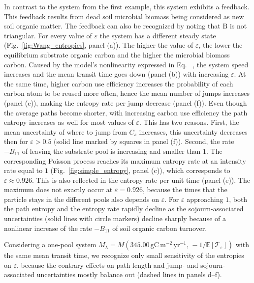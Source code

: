 \documentclass[smallextended]{svjour3}
\makeatletter
\renewcommand*{\eqref}[1]{%
  \hyperref[{#1}]{\textup{\tagform@{\ref*{#1}}}}%
}
\renewcommand{\tens}[1]{\mathrm{#1}}
\newcommand{\E}{\mathbb{E}}
\newcommand{\TT}{\mathcal{T}}
\newcommand{\gC}{\mathrm{gC}}
\newcommand{\yr}{\mathrm{yr}}
\newcommand{\meter}{\mathrm{m}}
\makeatother
\begin{document}
In contrast to the system from the first example, this system exhibits a feedback.
This feedback results from dead soil microbial biomass being considered as new soil organic matter.
The feedback can also be recognized by noting that $\tens{B}$ is not triangular.
For every value of $\varepsilon$ the system has a different steady state (Fig.~\ref{fig:Wang_entropies}, panel (a)).
The higher the value of $\varepsilon$, the lower the equilibrium substrate organic carbon and the higher the microbial biomass carbon.
Caused by the model's nonlinearity expressed in Eq.~\eqref{eqn:lambdax}, the system speed increases and the mean transit time goes down (panel (b)) with increasing $\varepsilon$.
At the same time, higher carbon use efficiency increases the probability of each carbon atom to be reused more often, hence the mean number of jumps increases (panel (c)), making the entropy rate per jump decrease (panel (f)).
Even though the average paths become shorter, with increasing carbon use efficiency the path entropy increases as well for most values of $\varepsilon$.
This has two reasons.
First, the mean uncertainty of where to jump from $C_s$ increases, this uncertainty decreases then for $\varepsilon>0.5$ (solid line marked by squares in panel (f)).
Second, the rate $-B_{11}$ of leaving the substrate pool is increasing and smaller than $1$.
The corresponding Poisson process reaches its maximum entropy rate at an intensity rate equal to $1$ (Fig.~\ref{fig:simple_entropy}, panel (c)), which corresponds to $\varepsilon\approx0.926$.
This is also reflected in the entropy rate per unit time (panel (e)).
The maximum does not exactly occur at $\varepsilon=0.926$, because the times that the particle stays in the different pools also depends on $\varepsilon$.
For $\varepsilon$ approaching $1$, both the path entropy and the entropy rate rapidly decline as the sojourn-associated uncertainties (solid lines with circle markers) decline sharply because of a nonlinear increase of the rate $-B_{11}$ of soil organic carbon turnover.

Considering a one-pool system $M_\lambda=M(345.00\,\gC\,\meter^{-2}\,\yr^{-1},\, -1/\E\left[\TT_\varepsilon\right])$ with the same mean transit time, we recognize only small sensitivity of the entropies on $\varepsilon$, because the contrary effects on path length and jump- and sojourn-associated uncertainties mostly balance out (dashed lines in panels d--f).
\end{document}
